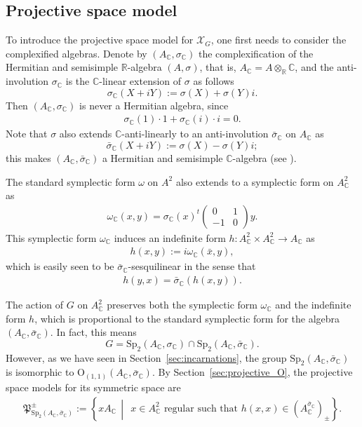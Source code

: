 \documentclass[oneside,11pt]{amsart}
\theoremstyle{definition}
\theoremstyle{remark}
\newcommand{\midwd}{\,\middle\vert\,}
\numberwithin{thm}{section}
\numberwithin{equation}{section}
\begin{document}
\subsection{Projective space model}\label{sec_proj-sp-mod}
To introduce the projective space model for $\mathcal{X}_{G}$, one first needs to consider the complexified algebras. Denote by $(A_\mathbb{C},\sigma_\mathbb{C})$ the complexification of the Hermitian and semisimple $\mathbb{R}$-algebra $(A,\sigma)$, that is, $A_\mathbb{C}=A\otimes_\mathbb{R}\mathbb{C}$, and the anti-involution $\sigma_\mathbb{C}$ is the $\mathbb{C}$-linear extension of $\sigma$ as follows
$$
\sigma_\mathbb{C}(X+iY):=\sigma(X)+\sigma(Y)i.
$$
Then $(A_\mathbb{C},\sigma_\mathbb{C})$ is never a Hermitian algebra, since
\begin{align*}
    \sigma_\mathbb{C}(1)\cdot 1+\sigma_\mathbb{C}(i)\cdot i=0.
\end{align*}
Note that $\sigma$ also extends $\mathbb{C}$-anti-linearly to an anti-involution $\bar \sigma_\mathbb{C}$ on $A_\mathbb{C}$ as
$$
\bar \sigma_\mathbb{C}(X+iY):=\sigma(X)-\sigma(Y)i;
$$
this makes $(A_\mathbb{C},\bar\sigma_\mathbb{C})$ a Hermitian and semisimple $\mathbb{C}$-algebra (see {\cite[Corollary 2.79]{ABRRW}}). 

The standard symplectic form $\omega$ on $A^2$ also extends to a symplectic form on $A_\mathbb{C}^2$ as
\begin{align}\label{com_symp}
    \omega_\mathbb{C}(x,y)=\sigma_\mathbb{C}(x)^t\begin{pmatrix}
        0&1\\
        -1&0
    \end{pmatrix}y.
\end{align}
This symplectic form $\omega_\mathbb{C}$ induces an indefinite form $h\colon A_\mathbb{C}^2\times A_\mathbb{C}^2\to A_\mathbb{C}$ as
\begin{align*}
    h(x,y):=i\omega_\mathbb{C}(\bar{x},y),
\end{align*}
which is easily seen to be $\bar\sigma_\mathbb{C}$-sesquilinear in the sense that
\begin{align*}
    h(y,x)=\bar\sigma_\mathbb{C}(h(x,y)).
\end{align*}

The action of $G$ on $A_\mathbb{C}^2$ preserves both the symplectic form $\omega_\mathbb{C}$ and the indefinite form $h$, which is proportional to the standard symplectic form for the algebra $(A_\mathbb C,\bar\sigma_\mathbb C)$. In fact, this means 
$$G = \mathrm{Sp}_{2}(A_\mathbb C,\sigma_\mathbb C)\cap\mathrm{Sp}_{2}(A_\mathbb C,\bar\sigma_\mathbb C).$$
However, as we have seen in Section~\ref{sec:incarnations}, the group $\mathrm{Sp}_{2}(A_\mathbb C,\bar\sigma_\mathbb C)$ is isomorphic to $\mathrm{O}_{(1,1)}(A_\mathbb C,\bar\sigma_\mathbb C)$. By Section~\ref{sec:projective_O}, the projective space models for its symmetric space are 
\begin{align*}
    \mathfrak{P}^\pm_{\mathrm{Sp}_{2}(A_\mathbb C,\bar\sigma_\mathbb C)}:=\left\{xA_\mathbb C\midwd\; x\in A_\mathbb C^{2}\text{ regular such that }h(x,x)\in (A_\mathbb C^{\bar\sigma_\mathbb C})_{\pm} \right\}.
\end{align*}
\end{document}

